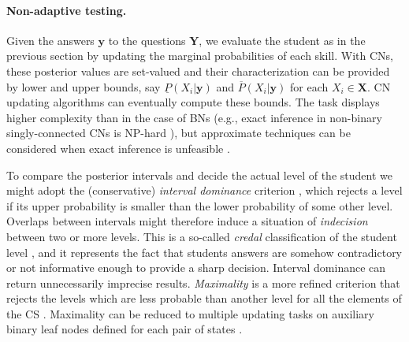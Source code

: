 \documentclass[runningheads]{llncs}
\begin{document}
	\paragraph{Non-adaptive testing.} Given the answers $\bm{y}$ to the questions 
	$\bm{Y}$, we evaluate the student as in the previous section by updating the marginal 
	probabilities of each skill. With CNs, these posterior values are set-valued and their 
	characterization can be provided by lower and upper bounds, say 
	$\underline{P}(X_i|\bm{y})$ and $\overline{P}(X_i|\bm{y})$ for each $X_i\in\bm{X}$. CN 
	updating algorithms can eventually compute these bounds. The task displays higher 
	complexity than in the case of BNs (e.g., exact inference in non-binary 
	singly-connected CNs is NP-hard \cite{maua14jair}), but approximate techniques can be 
	considered when exact inference is unfeasible \cite{antonucci2014e}. 
	
	To compare the posterior intervals and decide the actual level of the student we might 
	adopt the (conservative) \emph{interval dominance} criterion \cite{troffaes}, which 
	rejects a level if its upper probability is smaller than the lower probability of some other 
	level. Overlaps between intervals might therefore induce a situation of 
	\emph{indecision} between two or more levels. This is a so-called \emph{credal} 
	classification of the student level \cite{zaffalon2012evaluating}, and it represents the 
	fact that students answers are somehow contradictory or not informative enough to 
	provide a sharp decision. Interval dominance can return unnecessarily imprecise results. 
	\emph{Maximality} is a more refined criterion that rejects the levels which are less 
	probable than another level for all the elements of the CS \cite{walley1991statistical}. 
	Maximality  can be reduced to multiple updating tasks on auxiliary binary leaf nodes 
	defined for each pair of states \cite{antonucci2014e}.


	
\end{document}
